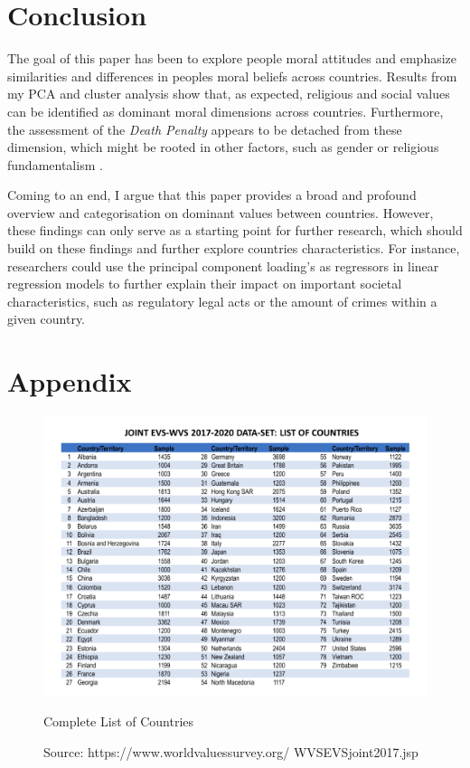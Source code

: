\documentclass{article}[hidelinks]
\begin{document}
\section{Conclusion}

The goal of this paper has been to explore people moral attitudes and emphasize similarities and differences in peoples moral beliefs across countries. Results from my PCA and cluster analysis show that, as expected, religious and social values can be identified as dominant moral dimensions across countries. Furthermore, the assessment of the \emph{Death Penalty} appears to be detached from these dimension, which might be rooted in other factors, such as gender or religious fundamentalism \citep{miller2008religious}. 

Coming to an end, I argue that this paper provides a broad and profound overview and categorisation on dominant values between countries. However, these findings can only serve as a starting point for further research, which should build on these findings and further explore countries characteristics. For instance, researchers could use the principal component loading's as regressors in linear regression models to further explain their impact on important societal characteristics, such as regulatory legal acts or the amount of crimes within a given country.

\newpage 
\newpage \section{Appendix}
\captionsetup{format=myformat} %
\begin{figure}[h]
    \centering
    \includegraphics[width=130mm]{Variable List.png}
    \caption{Complete List of Countries}
    \label{fig:names}
    \vspace{-9pt}
    \caption*{Source: https://www.worldvaluessurvey.org/ WVSEVSjoint2017.jsp}
\end{figure}
\end{document}
